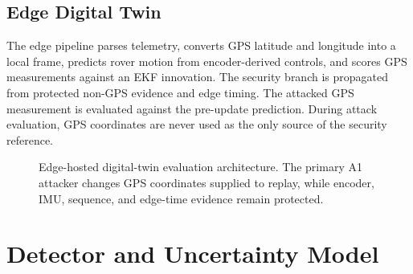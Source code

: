 \documentclass[conference]{IEEEtran}
\begin{document}
\subsection{Edge Digital Twin}

The edge pipeline parses telemetry, converts GPS latitude and longitude into a
local frame, predicts rover motion from encoder-derived controls, and scores
GPS measurements against an EKF innovation. The security branch is propagated
from protected non-GPS evidence and edge timing. The attacked GPS measurement
is evaluated against the pre-update prediction. During attack evaluation, GPS
coordinates are never used as the only source of the security reference.

\begin{figure}[t]
\centering
{}
\caption{Edge-hosted digital-twin evaluation architecture. The primary A1 attacker changes GPS coordinates supplied to replay, while encoder, IMU, sequence, and edge-time evidence remain protected.}
\label{fig:architecture}
\end{figure}

\section{Detector and Uncertainty Model}
\label{sec:detector}
\end{document}
